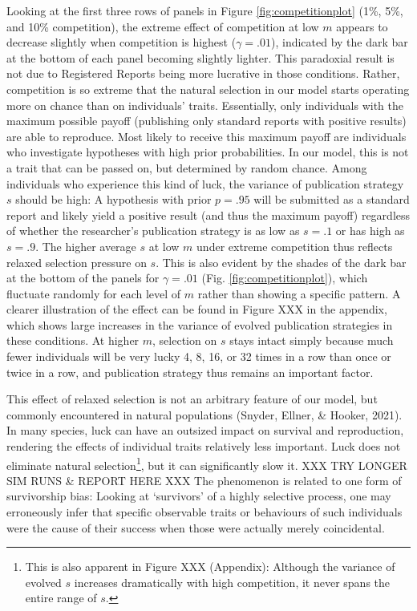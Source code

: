 \documentclass[
  ,man,mask,floatsintext]{apa6}
\begin{document}
Looking at the first three rows of panels in Figure \ref{fig:competitionplot} (1\%, 5\%, and 10\% competition), the extreme effect of competition at low \(m\) appears to decrease slightly when competition is highest (\(\gamma = .01\)), indicated by the dark bar at the bottom of each panel becoming slightly lighter.
This paradoxial result is not due to Registered Reports being more lucrative in those conditions.
Rather, competition is so extreme that the natural selection in our model starts operating more on chance than on individuals' traits.
Essentially, only individuals with the maximum possible payoff (publishing only standard reports with positive results) are able to reproduce.
Most likely to receive this maximum payoff are individuals who investigate hypotheses with high prior probabilities.
In our model, this is not a trait that can be passed on, but determined by random chance.
Among individuals who experience this kind of luck, the variance of publication strategy \(s\) should be high:
A hypothesis with prior \(p = .95\) will be submitted as a standard report and likely yield a positive result (and thus the maximum payoff) regardless of whether the researcher's publication strategy is as low as \(s = .1\) or has high as \(s = .9\).
The higher average \(s\) at low \(m\) under extreme competition thus reflects relaxed selection pressure on \(s\).
This is also evident by the shades of the dark bar at the bottom of the panels for \(\gamma = .01\) (Fig. \ref{fig:competitionplot}), which fluctuate randomly for each level of \(m\) rather than showing a specific pattern.
A clearer illustration of the effect can be found in Figure XXX in the appendix, which shows large increases in the variance of evolved publication strategies in these conditions.
At higher \(m\), selection on \(s\) stays intact simply because much fewer individuals will be very lucky 4, 8, 16, or 32 times in a row than once or twice in a row, and publication strategy thus remains an important factor.

This effect of relaxed selection is not an arbitrary feature of our model, but commonly encountered in natural populations (Snyder, Ellner, \& Hooker, 2021).
In many species, luck can have an outsized impact on survival and reproduction, rendering the effects of individual traits relatively less important.
Luck does not eliminate natural selection\footnote{This is also apparent in Figure XXX (Appendix): Although the variance of evolved \(s\) increases dramatically with high competition, it never spans the entire range of \(s\).}, but it can significantly slow it.
XXX TRY LONGER SIM RUNS \& REPORT HERE XXX
The phenomenon is related to one form of survivorship bias:
Looking at `survivors' of a highly selective process, one may erroneously infer that specific observable traits or behaviours of such individuals were the cause of their success when those were actually merely coincidental.
\end{document}
